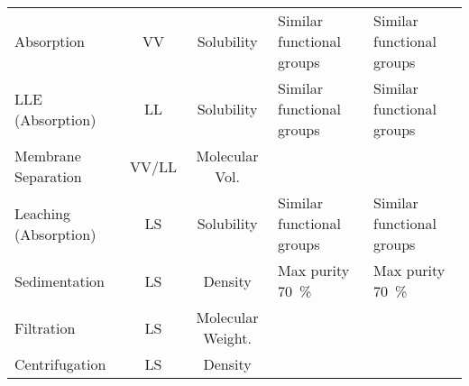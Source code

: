 \begin{landscape}
\begin{table}[H]
\begin{tabular}{lccll}
Absorption                                                                    & VV                            & Solubility                                     & \cellcolor[HTML]{F8CBAD}Similar functional groups                                         & \cellcolor[HTML]{F8CBAD}Similar functional groups                                                   \\
LLE (Absorption)                                                              & LL                            & Solubility                                     & \cellcolor[HTML]{F8CBAD}Similar functional groups                                         & \cellcolor[HTML]{F8CBAD}Similar functional groups                                                   \\
Membrane Separation                                                           & VV/LL                         & Molecular Vol.                                 &                                                                                           &                                                                                                     \\
Leaching (Absorption)                                                         & LS                            & Solubility                                     & \cellcolor[HTML]{F8CBAD}Similar functional groups                                         & \cellcolor[HTML]{F8CBAD}Similar functional groups                                                   \\
Sedimentation                                                                 & LS                            & Density                                        & \cellcolor[HTML]{F8CBAD}Max purity \SI{70}{\percent}                                                   & \cellcolor[HTML]{F8CBAD}Max purity \SI{70}{\percent}                                                             \\
Filtration                                                                    & LS                            & Molecular Weight.                              &                                                                                           &                                                                                                     \\
Centrifugation                                                                & LS                            & Density                                        &                                                                                           &                                                                                                     \\ \bottomrule
\end{tabular}
\end{table}



\end{landscape}
